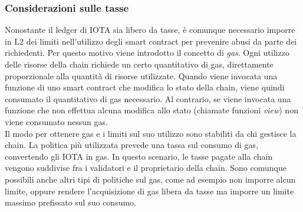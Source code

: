 \documentclass[12pt,a4paper,openright,twoside]{report}
\begin{document}
\subsubsection{Considerazioni sulle tasse}
Nonostante il ledger di IOTA sia libero da tasse, è comunque necessario imporre in L2 dei limiti nell'utilizzo degli smart contract per prevenire abusi da parte dei richiedenti. Per questo motivo viene introdotto il concetto di \textit{gas}. Ogni utilizzo delle risorse della chain richiede un certo quantitativo di gas, direttamente proporzionale alla quantità di risorse utilizzate. Quando viene invocata una funzione di uno smart contract che modifica lo stato della chain, viene quindi consumato il quantitativo di gas necessario. Al contrario, se viene invocata una funzione che non effettua alcuna modifica allo stato (chiamate funzioni \textit{view}) non viene consumato nessun gas.\\
Il modo per ottenere gas e i limiti sul suo utilizzo sono stabiliti da chi gestisce la chain. La politica più utilizzata prevede una tassa sul consumo di gas, convertendo gli IOTA in gas. In questo scenario, le tasse pagate alla chain vengono suddivise fra i validatori e il proprietario della chain. Sono comunque possibili anche altri tipi di politiche sul gas, come ad esempio non imporre alcun limite, oppure rendere l'acquisizione di gas libera da tasse ma imporre un limite massimo prefissato sul suo consumo.
\end{document}
